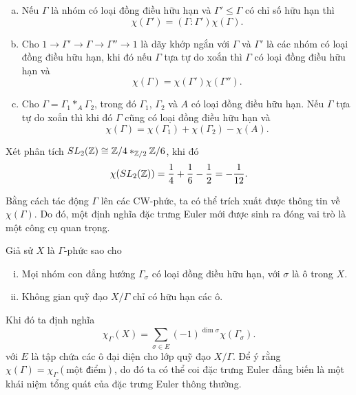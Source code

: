 \begin{proposition}\label{prop:euler-list}
    \begin{enumerate}[(a)]
        \item Nếu $\Gamma$ là nhóm có loại đồng điều hữu hạn và $\Gamma' \leq \Gamma$ có chỉ số hữu hạn thì
              $$
                  \chi(\Gamma') = (\Gamma : \Gamma') \chi(\Gamma).
              $$
        \item Cho $1 \xrightarrow{} \Gamma' \xrightarrow{} \Gamma \xrightarrow{} \Gamma'' \xrightarrow{} 1$ là dãy khớp ngắn với $\Gamma$ và $\Gamma'$ là các nhóm có loại đồng điều hữu hạn, khi đó nếu $\Gamma$ tựa tự do xoắn thì $\Gamma$ có loại đồng điều hữu hạn và
              $$
                  \chi(\Gamma) = \chi(\Gamma') \chi(\Gamma'').
              $$
        \item Cho $\Gamma = \Gamma_1 *_A \Gamma_2$, trong đó $\Gamma_1$, $\Gamma_2$ và $A$ có loại đồng điều hữu hạn. Nếu $\Gamma$ tựa tự do xoắn thì khi đó $\Gamma$ cũng có loại đồng điều hữu hạn và
              $$
                  \chi(\Gamma) = \chi(\Gamma_1) + \chi(\Gamma_2) - \chi(A).
              $$
    \end{enumerate}
\end{proposition}

\begin{example}
    Xét phân tích $SL_2(\mathbb Z) \cong \mathbb Z/4 *_{\mathbb Z/2} \mathbb Z/6$, khi đó
    $$
        \chi(SL_2(\mathbb Z)) = \frac{1}{4} + \frac{1}{6} - \frac{1}{2} = -\frac{1}{12}.
    $$
\end{example}

Bằng cách tác động $\Gamma$ lên các CW-phức, ta có thể trích xuất được thông tin về $\chi(\Gamma)$. Do đó, một định nghĩa đặc trưng Euler mới được sinh ra đóng vai trò là một công cụ quan trọng.
\begin{define}
    Giả sử $X$ là $\Gamma$-phức sao cho
    \begin{enumerate}[(i)]
        \item Mọi nhóm con đẳng hướng $\Gamma_\sigma$ có loại đồng điều hữu hạn, với $\sigma$ là ô trong $X$.
        \item Không gian quỹ đạo $X/\Gamma$ chỉ có hữu hạn các ô.
    \end{enumerate}
    Khi đó ta định nghĩa 
    $$
        \chi_{\Gamma}(X) = \sum_{\sigma \in E} (-1)^{\dim \sigma} \chi(\Gamma_\sigma).
    $$
    với $E$ là tập chứa các ô đại diện cho lớp quỹ đạo $X/\Gamma$. Để ý rằng $\chi(\Gamma) = \chi_{\Gamma}(\text{một điểm})$, do đó ta có thể coi đặc trưng Euler đẳng biến là một khái niệm tổng quát của đặc trưng Euler thông thường.
\end{define}

